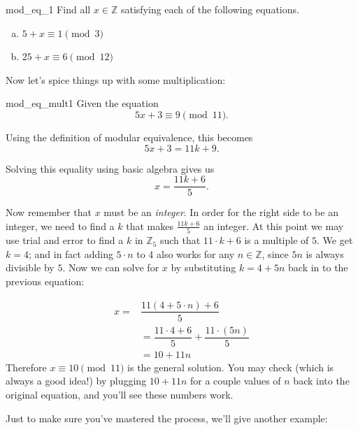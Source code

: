 \begin{exercise}{mod_eq_1}
Find all $x \in {\mathbb Z}$ satisfying each of the following equations.

\begin{enumerate}[(a)]
\item
$5 + x \equiv 1 \pmod{ 3}$
\item
$25 + x \equiv 6 \pmod{ 12}$
\end{enumerate}
\end{exercise}

Now let's spice things up with some multiplication:

\begin{example}{mod_eq_mult1} Given the equation
\[
5x + 3 \equiv 9 \pmod{11}.
\]

\noindent
Using the definition of modular equivalence, this becomes
\[
5x + 3 = 11k + 9.
\]

\noindent
Solving this equality using basic algebra gives us 
\[
x = \frac{11k + 6}{5}. 
\]

Now remember that $x$ must be an \emph{integer}.  In order for the right side to be an integer, we need to find a $k$ that makes $\frac{11k+6}{5}$ an integer. At this point we may use trial and error to find a $k$ in ${\mathbb Z}_5$ such that $11 \cdot k + 6$ is a multiple of $5$. We get $k=4$; and in fact adding $5\cdot n$ to 4 also works for any $n \in {\mathbb Z}$, since $5n$ is always divisible by $5$.  Now we can solve for $x$ by substituting $k=4+5n$ back in to the previous equation:

\begin{align*}
x =& \dfrac{11(4 + 5\cdot n) + 6}{5} \\
&=\dfrac{11\cdot 4 + 6}{5} + \dfrac{11 \cdot (5 n)}{5} \\
& = 10 + 11 n 
\end{align*}
Therefore $x \equiv 10 \pmod{11}$ is the general solution.  You may check (which is always a good idea!) by plugging $10 + 11n$ for a couple values of $n$ back into the original equation, and you'll see these numbers work.
\end{example}




Just to make sure you've mastered the process, we'll give another example:

